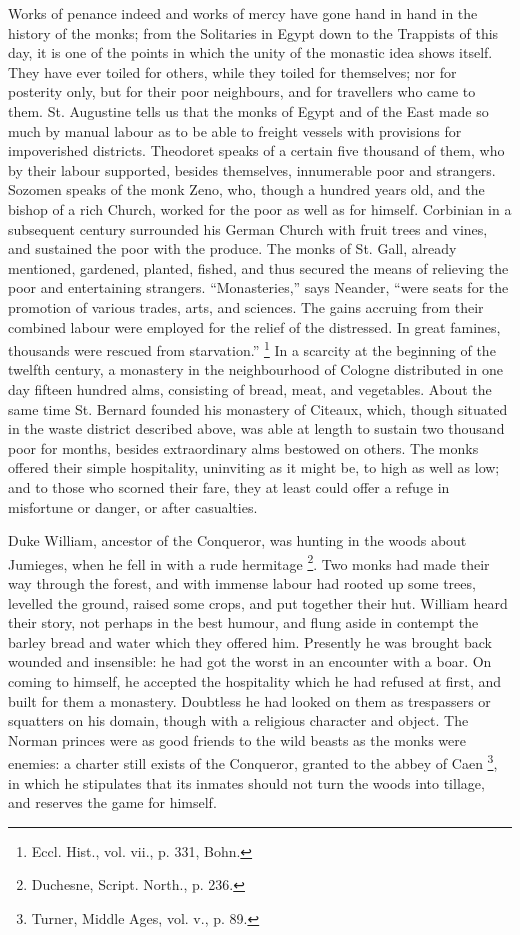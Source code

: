 Works of penance indeed and works of mercy have gone hand in hand
in the history of the monks; from the Solitaries in Egypt down to the
Trappists of this day, it is one of the points in which the unity of
the monastic idea shows itself. They have ever toiled for others,
while they toiled for themselves; nor for posterity only, but for
their poor neighbours, and for travellers who came to them. St.
Augustine tells us that the monks of Egypt and of the East made so
much by manual labour as to be able to freight vessels with provisions
for impoverished districts. Theodoret speaks of a certain five
thousand of them, who by their labour supported, besides themselves,
innumerable poor and strangers. Sozomen speaks of the monk Zeno, who,
though a hundred years old, and the bishop of a rich Church, worked
for the poor as well as for himself. Corbinian in a subsequent century
surrounded his German Church with fruit trees and vines, and sustained
the poor with the produce. The monks of St. Gall, already mentioned,
gardened, planted, fished, and thus secured the means of relieving the
poor and entertaining strangers. ``Monasteries,'' says Neander,
``were seats for the promotion of various trades, arts, and
sciences. The gains accruing from their combined labour were employed
for the relief of the distressed. In great famines, thousands were
rescued from starvation.'' \footnote{Eccl. Hist.,
vol. vii., p. 331, Bohn.} In a scarcity at the beginning of the twelfth century, a
monastery in the neighbourhood of Cologne distributed in one day
fifteen hundred alms, consisting of bread, meat, and vegetables. About
the same time St. Bernard founded his monastery of Citeaux, which,
though situated in the waste district described above, was able at
length to sustain two thousand poor for months, besides extraordinary
alms bestowed on others. The monks offered their simple hospitality,
uninviting as it might be, to high as well as low; and to those who
scorned their fare, they at least could offer a refuge in misfortune
or danger, or after casualties.

Duke William, ancestor of the Conqueror, was hunting in the woods
about Jumieges, when he fell in with a rude hermitage \footnote{Duchesne,
Script. North., p. 236.}. Two monks had made their way through the forest, and with
immense labour had rooted up some trees, levelled the ground, raised
some crops, and put together their hut. William heard their story, not
perhaps in the best humour, and flung aside in contempt the barley
bread and water which they offered him. Presently he was brought back
wounded and insensible: he had got the worst in an encounter with a
boar. On coming to himself, he accepted the hospitality which he had
refused at first, and built for them a monastery. Doubtless he had
looked on them as trespassers or squatters on his domain, though with
a religious character and object. The Norman princes were as good
friends to the wild beasts as the monks were enemies: a charter still
exists of the Conqueror, granted to the abbey of Caen \footnote{Turner,
Middle Ages, vol. v., p. 89.}, in which he stipulates that its inmates should not turn the
woods into tillage, and reserves the game for himself.

